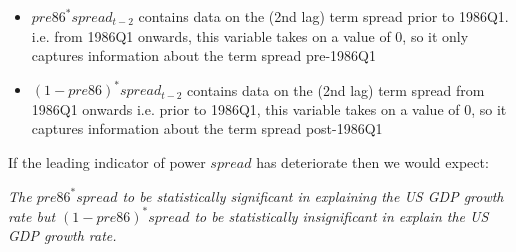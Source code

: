 \documentclass[12pt]{report}
\begin{document}
\begin{itemize}
	\item $pre86^*spread_{t-2}$ contains data on the (2nd lag) term spread prior to 1986Q1. i.e. from 1986Q1 onwards, this variable takes on a value of 0, so it only captures information about the term spread pre-1986Q1
	\item $(1-pre86)^*spread_{t-2}$ contains data on the (2nd lag) term spread from 1986Q1 onwards i.e. prior to 1986Q1, this variable takes on a value of 0, so it captures information about the term spread post-1986Q1
\end{itemize}

\noindent If the leading indicator of power $spread$ has deteriorate then we would expect:
\begin{center}
	\textit{The $pre86^*spread$ to be statistically significant in explaining the US GDP growth rate but $(1-pre86)^*spread$ to be statistically insignificant in explain the US GDP growth rate.}
\end{center} 
\end{document}
